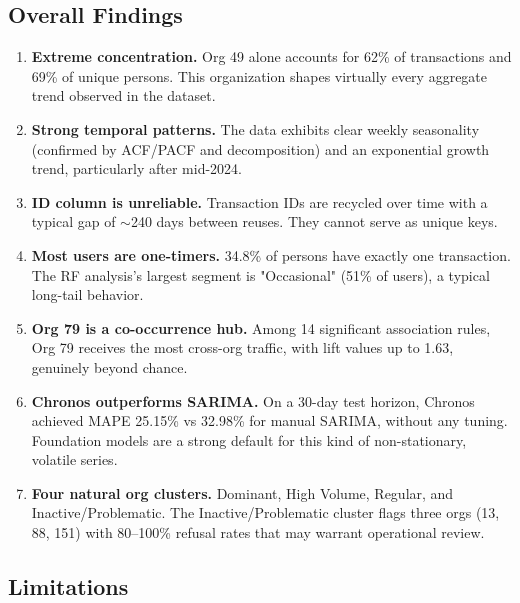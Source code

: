 \documentclass[11pt,a4paper]{article}
\begin{document}
\subsection{Overall Findings}

\begin{enumerate}
    \item \textbf{Extreme concentration.} Org 49 alone accounts for 62\% of transactions and 69\% of unique persons. This organization shapes virtually every aggregate trend observed in the dataset.

    \item \textbf{Strong temporal patterns.} The data exhibits clear weekly seasonality (confirmed by ACF/PACF and decomposition) and an exponential growth trend, particularly after mid-2024.

    \item \textbf{ID column is unreliable.} Transaction IDs are recycled over time with a typical gap of $\sim$240 days between reuses. They cannot serve as unique keys.

    \item \textbf{Most users are one-timers.} 34.8\% of persons have exactly one transaction. The RF analysis's largest segment is "Occasional" (51\% of users), a typical long-tail behavior.

    \item \textbf{Org 79 is a co-occurrence hub.} Among 14 significant association rules, Org 79 receives the most cross-org traffic, with lift values up to 1.63, genuinely beyond chance.

    \item \textbf{Chronos outperforms SARIMA.} On a 30-day test horizon, Chronos achieved MAPE 25.15\% vs 32.98\% for manual SARIMA, without any tuning. Foundation models are a strong default for this kind of non-stationary, volatile series.

    \item \textbf{Four natural org clusters.} Dominant, High Volume, Regular, and Inactive/Problematic. The Inactive/Problematic cluster flags three orgs (13, 88, 151) with 80--100\% refusal rates that may warrant operational review.
\end{enumerate}

\subsection{Limitations}
\end{document}
